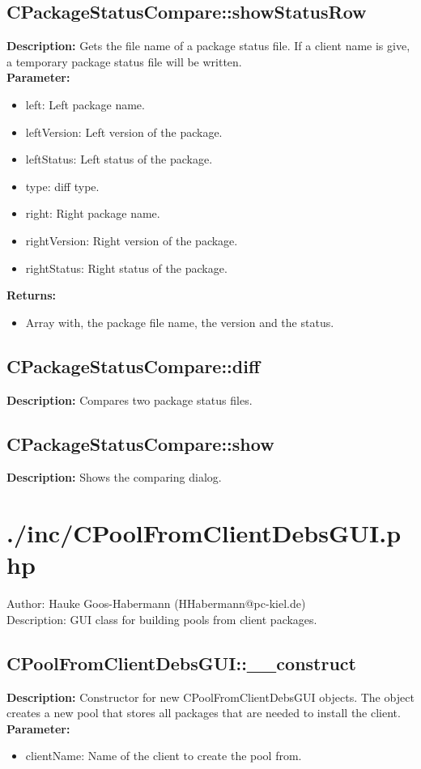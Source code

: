 \subsection{CPackageStatusCompare::showStatusRow}
\textbf{Description:} Gets the file name of a package status file. If a client name is give, a temporary package status file will be written.\\
\textbf{Parameter:}
\begin{itemize}
\item left: Left package name.
\item leftVersion: Left version of the package.
\item leftStatus: Left status of the package.
\item type: diff type.
\item right: Right package name.
\item rightVersion: Right version of the package.
\item rightStatus: Right status of the package.
\end{itemize}
\textbf{Returns:}
\begin{itemize}
\item Array with, the package file name, the version and the status.
\end{itemize}

\subsection{CPackageStatusCompare::diff}
\textbf{Description:} Compares two package status files.\\

\subsection{CPackageStatusCompare::show}
\textbf{Description:} Shows the comparing dialog.\\

\newpage\section{./inc/CPoolFromClientDebsGUI.php}
 Author: Hauke Goos-Habermann (HHabermann@pc-kiel.de)\\
 Description: GUI class for building pools from client packages.\\

\subsection{CPoolFromClientDebsGUI::\_\_construct}
\textbf{Description:} Constructor for new CPoolFromClientDebsGUI objects. The object creates a new pool that stores all packages that are needed to install the client.\\
\textbf{Parameter:}
\begin{itemize}
\item clientName: Name of the client to create the pool from.
\end{itemize}

